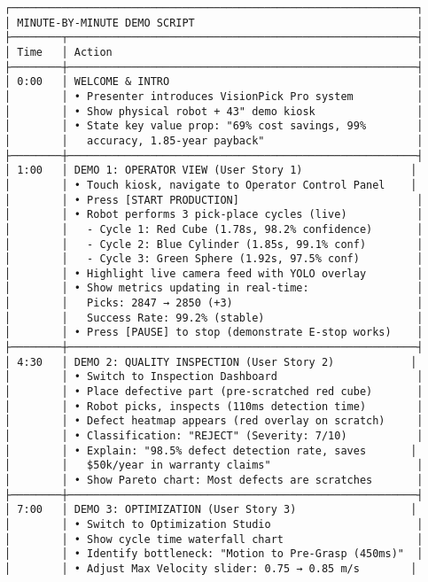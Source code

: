 \documentclass[
]{article}
\begin{document}
\begin{verbatim}
┌────────────────────────────────────────────────────────────────┐
│ MINUTE-BY-MINUTE DEMO SCRIPT                                   │
├────────┬───────────────────────────────────────────────────────┤
│ Time   │ Action                                                │
├────────┼───────────────────────────────────────────────────────┤
│ 0:00   │ WELCOME & INTRO                                       │
│        │ • Presenter introduces VisionPick Pro system          │
│        │ • Show physical robot + 43" demo kiosk                │
│        │ • State key value prop: "69% cost savings, 99%        │
│        │   accuracy, 1.85-year payback"                        │
├────────┼───────────────────────────────────────────────────────┤
│ 1:00   │ DEMO 1: OPERATOR VIEW (User Story 1)                 │
│        │ • Touch kiosk, navigate to Operator Control Panel    │
│        │ • Press [START PRODUCTION]                            │
│        │ • Robot performs 3 pick-place cycles (live)           │
│        │   - Cycle 1: Red Cube (1.78s, 98.2% confidence)       │
│        │   - Cycle 2: Blue Cylinder (1.85s, 99.1% conf)        │
│        │   - Cycle 3: Green Sphere (1.92s, 97.5% conf)         │
│        │ • Highlight live camera feed with YOLO overlay        │
│        │ • Show metrics updating in real-time:                 │
│        │   Picks: 2847 → 2850 (+3)                             │
│        │   Success Rate: 99.2% (stable)                        │
│        │ • Press [PAUSE] to stop (demonstrate E-stop works)    │
├────────┼───────────────────────────────────────────────────────┤
│ 4:30   │ DEMO 2: QUALITY INSPECTION (User Story 2)            │
│        │ • Switch to Inspection Dashboard                      │
│        │ • Place defective part (pre-scratched red cube)       │
│        │ • Robot picks, inspects (110ms detection time)        │
│        │ • Defect heatmap appears (red overlay on scratch)     │
│        │ • Classification: "REJECT" (Severity: 7/10)           │
│        │ • Explain: "98.5% defect detection rate, saves       │
│        │   $50k/year in warranty claims"                       │
│        │ • Show Pareto chart: Most defects are scratches       │
├────────┼───────────────────────────────────────────────────────┤
│ 7:00   │ DEMO 3: OPTIMIZATION (User Story 3)                  │
│        │ • Switch to Optimization Studio                       │
│        │ • Show cycle time waterfall chart                     │
│        │ • Identify bottleneck: "Motion to Pre-Grasp (450ms)"  │
│        │ • Adjust Max Velocity slider: 0.75 → 0.85 m/s        │

\end{verbatim}
\end{document}
